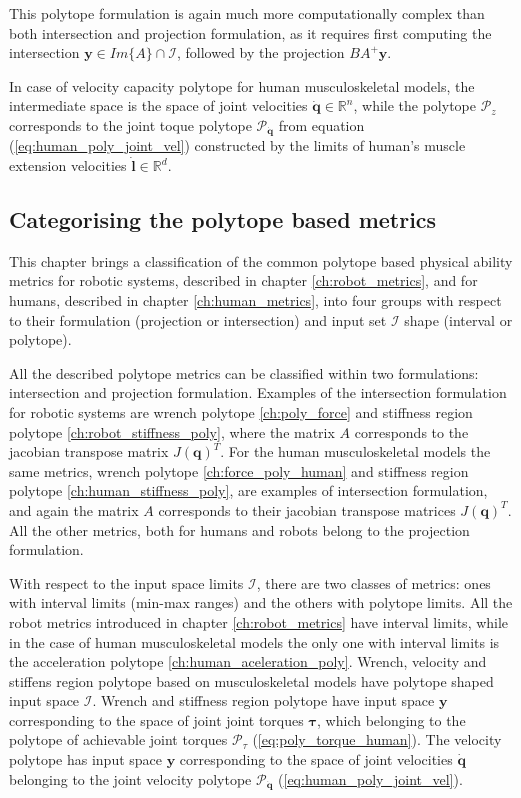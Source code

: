 This polytope formulation is again much more computationally complex than both intersection and projection formulation, as it requires first computing the intersection $\bm{y} \in Im\{A\}\cap\mathcal{I}$, followed by the projection $BA^{+}\bm{y}$. 


In case of velocity capacity polytope for human musculoskeletal models, the intermediate space is the space of joint velocities $\dot{\bm{q}}\in\mathbb{R}^n$, while the polytope $\mathcal{P}_z$ corresponds to the joint toque polytope $\mathcal{P}_{\dot{\bm{q}}}$ from equation (\ref{eq:human_poly_joint_vel}) constructed by the limits of human's muscle extension velocities $\dot{\bm{l}}\in\mathbb{R}^d$.


\subsection{Categorising the polytope based metrics}
\label{ch:which_metric_which_formulation}

This chapter brings a classification of the common polytope based physical ability metrics for robotic systems, described in chapter \ref{ch:robot_metrics}, and for humans, described in chapter \ref{ch:human_metrics}, into four groups with respect to their formulation (projection or intersection) and input set $\mathcal{I}$ shape (interval or polytope). 

All the described polytope metrics can be classified within two formulations: intersection and projection formulation. 
Examples of the intersection formulation for robotic systems are wrench polytope \ref{ch:poly_force} and stiffness region polytope \ref{ch:robot_stiffness_poly}, where the matrix $A$ corresponds to the jacobian transpose matrix $J(\bm{q})^T$. For the human musculoskeletal models the same metrics, wrench polytope \ref{ch:force_poly_human} and stiffness region polytope \ref{ch:human_stiffness_poly}, are examples of intersection formulation, and again the matrix $A$ corresponds to their jacobian transpose matrices $J(\bm{q})^T$. All the other metrics, both for humans and robots belong to the projection formulation.

With respect to the input space limits $\mathcal{I}$, there are two classes of metrics: ones with interval limits (min-max ranges) and the others with polytope limits. All the robot metrics introduced in chapter \ref{ch:robot_metrics} have interval limits, while in the case of human musculoskeletal models the only one with interval limits is the acceleration polytope \ref{ch:human_aceleration_poly}. Wrench, velocity and stiffens region polytope based on musculoskeletal models have polytope shaped input space $\mathcal{I}$. Wrench and stiffness region polytope have input space $\bm{y}$ corresponding to the space of joint joint torques $\bm{\tau}$, which belonging to the polytope of achievable joint torques $\mathcal{P}_\tau$ (\ref{eq:poly_torque_human}). The velocity polytope has input space $\bm{y}$ corresponding to the space of joint velocities $\dot{\bm{q}}$ belonging to the joint velocity polytope $\mathcal{P}_{\dot{\bm{q}}}$ (\ref{eq:human_poly_joint_vel}).

